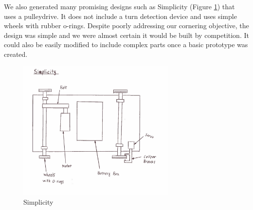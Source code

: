 \documentclass[class=../report, crop=false]{standalone}
\begin{document}
\clearpage

We also generated many promising designs such as Simplicity (Figure \ref{fig:simplicity}) that uses a \gls{pulleydrive}.
It does not include a turn detection device and uses simple wheels with rubber o-rings.
Despite poorly addressing our cornering objective, the design was simple and we were almost certain it would be built by competition.
It could also be easily modified to include complex parts once a basic prototype was created.

\begin{figure}[H]
	\centering
	\includegraphics[width=0.7\textwidth]{../res/img/simplicity}
	\caption{Simplicity}
	\label{fig:simplicity}
\end{figure}
\end{document}
